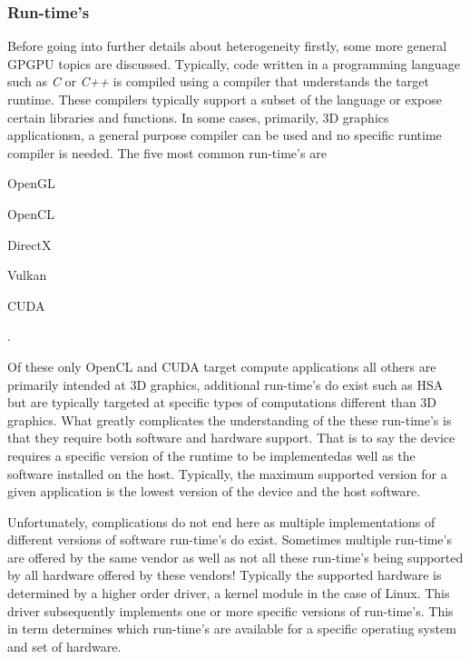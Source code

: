 \documentclass[conference]{IEEEtran}
\begin{document}
\subsubsection*{Run-time's}

Before going into further details about heterogeneity firstly, some more
general GPGPU topics are discussed. Typically, code written in a programming
language such as \textit{C} or \textit{C++} is compiled using a compiler that
understands the target runtime. These compilers typically support a subset of
the language or expose certain libraries and functions\footnotemark[3]. In some
cases, primarily, 3D graphics applicationsn\footnotemark[4], a general purpose
compiler can be used and no specific runtime compiler is needed. The five most
common run-time's are \begin{enumerate*} \item OpenGL \item OpenCL \item
DirectX \item Vulkan \item CUDA \end{enumerate*}.



Of these only OpenCL and CUDA target compute applications all others are
primarily intended at 3D graphics, additional run-time's do exist such as HSA
but are typically targeted at specific types of computations different
than 3D graphics. What greatly complicates the understanding of the these
run-time's is that they require both software and hardware support. That is to
say the device requires a specific version of the runtime to be
implemented\footnotemark[5] as well as the software installed on the host.
Typically, the maximum supported version for a given application is the lowest
version of the device and the host software.


Unfortunately, complications do not end here as multiple implementations of
different versions of software run-time's do exist. Sometimes multiple
run-time's are offered by the same vendor as well as not all these run-time's
being supported by all hardware offered by these vendors! Typically the
supported hardware is determined by a higher order driver, a kernel module in
the case of Linux. This driver subsequently implements one or more specific
versions of run-time's. This in term determines which run-time's are available
for a specific operating system and set of hardware.
\end{document}
